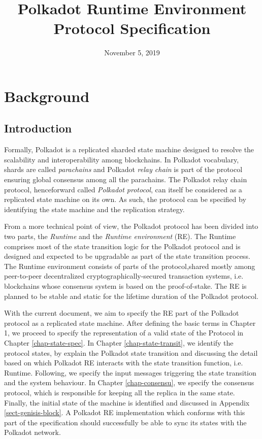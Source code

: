 \documentclass{book}
\newcommand{\tmem}[1]{{\em #1\/}}
\newcommand{\tmtextit}[1]{{\itshape{#1}}}
\providecommand{\tmem}[1]{\tmtextit{#1}}
\providecommand{\tmtextit}[1]{\tmtextit{#1}}
\begin{document}
\title{
  Polkadot Runtime Environment\\
  {\Large Protocol Specification}
}

\date{November 5, 2019}

\maketitle

{\tableofcontents}

\chapter{Background}

\section{Introduction}

Formally, Polkadot is a replicated sharded state machine designed to resolve
the scalability and interoperability among blockchains. In Polkadot
vocabulary, shards are called {\tmem{parachains}} and Polkadot {\tmem{relay
chain}} is part of the protocol ensuring global consensus among all the
parachains. The Polkadot relay chain protocol, henceforward called
{\tmem{Polkadot protocol}}, can itself be considered as a replicated state
machine on its own. As such, the protocol can be specified by identifying the
state machine and the replication strategy.

From a more technical point of view, the Polkadot protocol has been divided
into two parts, the {\tmem{Runtime}} and the {\tmem{Runtime environment}}
(RE). The Runtime comprises most of the state transition logic for the
Polkadot protocol and is designed and expected to be upgradable as part of the
state transition process. The Runtime environment consists of parts of the
protocol,\quad shared mostly among peer-to-peer decentralized
cryptographically-secured transaction systems, i.e. blockchains whose
consensus system is based on the proof-of-stake. The RE is planned to be
stable and static for the lifetime duration of the Polkadot protocol.

With the current document, we aim to specify the RE part of the Polkadot
protocol as a replicated state machine. After defining the basic terms in
Chapter 1, we proceed to specify the representation of a valid state of the
Protocol in Chapter \ref{chap-state-spec}. In Chapter
\ref{chap-state-transit}, we identify the protocol states, by explain the
Polkadot state transition and discussing the detail based on which Polkadot RE
interacts with the state transition function, i.e. Runtime. Following, we
specify the input messages triggering the state transition and the system
behaviour. In Chapter \ref{chap-consensu}, we specify the consensus protocol,
which is responsible for keeping all the replica in the same state. Finally,
the initial state of the machine is identified and discussed in Appendix
\ref{sect-genisis-block}. A Polkadot RE implementation which conforms with
this part of the specification should successfully be able to sync its states
with the Polkadot network.
\end{document}
